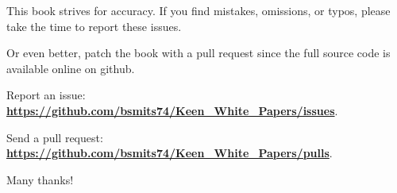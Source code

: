 This book strives for accuracy. If you find mistakes, omissions, or typos, please take the time to report these issues.\\ 
\par
Or even better, patch the book with a pull request since the full source code is available online on github.\\
\par
Report an issue: \textbf{\href{https://github.com/bsmits74/Keen_White_Papers/issues}{https://github.com/bsmits74/Keen\_White\_Papers/issues}}.\\
\par
Send a pull request: \textbf{\href{https://github.com/bsmits74/Keen_White_Papers/pulls}{https://github.com/bsmits74/Keen\_White\_Papers/pulls}}.\\
\par
Many thanks!\\
